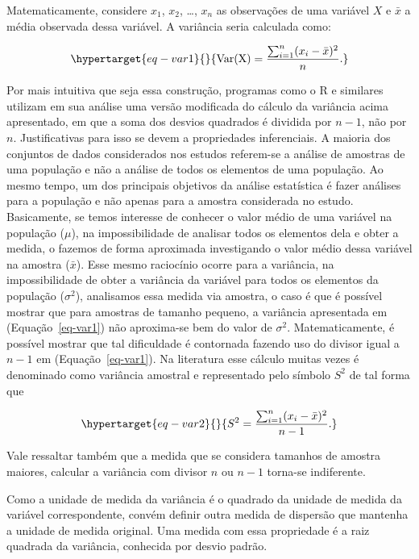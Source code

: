 \documentclass[
  letterpaper,
  DIV=11,
  numbers=noendperiod]{scrreprt}
\begin{document}
Matematicamente, considere \(x_1\), \(x_2\), \ldots, \(x_n\) as
observações de uma variável \(X\) e \(\bar{x}\) a média observada dessa
variável. A variância seria calculada como:

\begin{equation}\protect\hypertarget{eq-var1}{}{
\mbox{Var(X)} = \frac{\sum_{i = 1}^n (x_i - \bar{x})^2}{n}.
}\label{eq-var1}\end{equation}

Por mais intuitiva que seja essa construção, programas como o R e
similares utilizam em sua análise uma versão modificada do cálculo da
variância acima apresentado, em que a soma dos desvios quadrados é
dividida por \(n-1\), não por \(n\). Justificativas para isso se devem a
propriedades inferenciais. A maioria dos conjuntos de dados considerados
nos estudos referem-se a análise de amostras de uma população e não a
análise de todos os elementos de uma população. Ao mesmo tempo, um dos
principais objetivos da análise estatística é fazer análises para a
população e não apenas para a amostra considerada no estudo.
Basicamente, se temos interesse de conhecer o valor médio de uma
variável na população (\(\mu\)), na impossibilidade de analisar todos os
elementos dela e obter a medida, o fazemos de forma aproximada
investigando o valor médio dessa variável na amostra (\(\bar{x}\)). Esse
mesmo raciocínio ocorre para a variância, na impossibilidade de obter a
variância da variável para todos os elementos da população
(\(\sigma^2\)), analisamos essa medida via amostra, o caso é que é
possível mostrar que para amostras de tamanho pequeno, a variância
apresentada em (Equação~\ref{eq-var1}) não aproxima-se bem do valor de
\(\sigma^2\). Matematicamente, é possível mostrar que tal dificuldade é
contornada fazendo uso do divisor igual a \(n-1\) em
(Equação~\ref{eq-var1}). Na literatura esse cálculo muitas vezes é
denominado como variância amostral e representado pelo símbolo \(S^2\)
de tal forma que

\begin{equation}\protect\hypertarget{eq-var2}{}{
S^2 = \frac{\sum_{i = 1}^n (x_i - \bar{x})^2}{n-1}.
}\label{eq-var2}\end{equation}

Vale ressaltar também que a medida que se considera tamanhos de amostra
maiores, calcular a variância com divisor \(n\) ou \(n-1\) torna-se
indiferente.

Como a unidade de medida da variância é o quadrado da unidade de medida
da variável correspondente, convém definir outra medida de dispersão que
mantenha a unidade de medida original. Uma medida com essa propriedade é
a raiz quadrada da variância, conhecida por desvio padrão.
\end{document}
